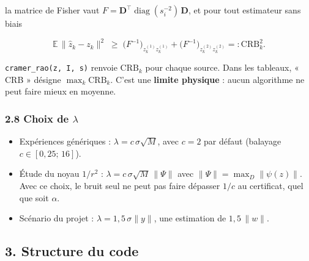 \documentclass[
  french,
]{article}
\providecommand{\tightlist}{%
  \setlength{\itemsep}{0pt}\setlength{\parskip}{0pt}}
\begin{document}
la matrice de Fisher vaut
\(F = \mathbf{D}^{\top}\operatorname{diag}(s_i^{-2})\,\mathbf{D}\), et
pour tout estimateur sans biais

\[
\mathbb{E}\,\lVert\hat z_k - z_k\rVert^2 \;\ge\; \big(F^{-1}\big)_{z_k^{(1)} z_k^{(1)}} + \big(F^{-1}\big)_{z_k^{(2)} z_k^{(2)}} =: \mathrm{CRB}_k^2 .
\]

\texttt{cramer\_rao(z,\ I,\ s)} renvoie \(\mathrm{CRB}_k\) pour chaque
source. Dans les tableaux, « CRB » désigne \(\max_k \mathrm{CRB}_k\).
C'est une \textbf{limite physique} : aucun algorithme ne peut faire
mieux en moyenne.

\subsubsection{\texorpdfstring{2.8 Choix de
\(\lambda\)}{2.8 Choix de \textbackslash lambda}}\label{choix-de-lambda}

\begin{itemize}
\tightlist
\item
  Expériences génériques : \(\lambda = c\,\sigma\sqrt{M}\), avec
  \(c = 2\) par défaut (balayage \(c\in[0{,}25;\,16]\)).
\item
  Étude du noyau \(1/r^2\) :
  \(\lambda = c\,\sigma\sqrt{M}\,\lVert\Psi\rVert\) avec
  \(\lVert\Psi\rVert = \max_D\lVert\psi(z)\rVert\). Avec ce choix, le
  bruit seul ne peut pas faire dépasser \(1/c\) au certificat, quel que
  soit \(\alpha\).
\item
  Scénario du projet : \(\lambda = 1{,}5\,\sigma\lVert y\rVert\), une
  estimation de \(1{,}5\,\lVert w\rVert\).
\end{itemize}

\subsection{3. Structure du code}\label{structure-du-code}
\end{document}
